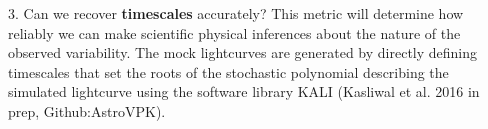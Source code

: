 \documentclass[11pt]{article}
\begin{document}
3. Can we recover \textbf{timescales} accurately? This metric will determine how reliably we can make scientific physical inferences about the nature of the observed variability.  The mock lightcurves are generated by directly defining timescales that set the roots of the stochastic polynomial describing the simulated lightcurve using the software library KALI (Kasliwal et al. 2016 in prep, Github:AstroVPK). 
\end{document}
